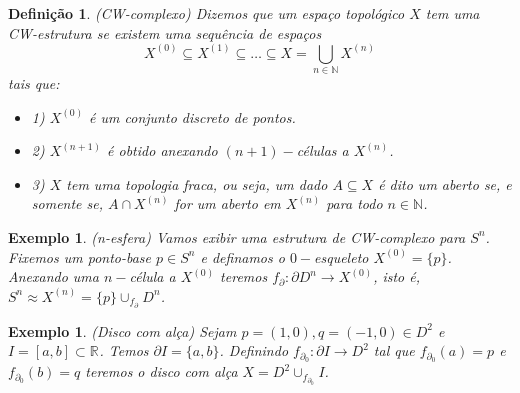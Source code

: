 \documentclass{beamer}
\newtheorem{definicao}[teorema]{Definição}
\newtheorem{exemplo}[teorema]{Exemplo}
\newcommand{\celula}[2]{D^{#1}_{#2}}
\newcommand{\real}[1]{\mathbb{R}^{#1}}
\newcommand{\reta}{\real{}}
\newcommand{\skeleton}[1]{X^{(#1)}}
\begin{document}
\begin{frame}
	
	\begin{definicao}
		(CW-complexo) Dizemos que um espaço topológico $X$ tem uma CW-estrutura se existem uma sequência de espaços
		$$
		\skeleton{0} \subseteq \skeleton{1} \subseteq \dots \subseteq X = \bigcup \limits_{n\in \mathbb{N}} \skeleton{n}
		$$ 
		tais que:
		\begin{itemize}
			\item 1) $\skeleton{0}$ é um conjunto discreto de pontos.
			
			\item 2) $\skeleton{n+1}$ é obtido anexando $(n+1)-$células a $\skeleton{n}$.
			
			\item 3) $X$ tem uma topologia fraca, ou seja, um dado $A \subseteq X$ é dito um aberto se, e somente se, $A \cap \skeleton{n}$ for um aberto em $\skeleton{n}$ para todo $n \in \mathbb{N}$.
		\end{itemize}
	\end{definicao}
\end{frame}


\begin{frame}
	\begin{exemplo}
		(n-esfera) Vamos exibir uma estrutura de CW-complexo para $S^{n}$. Fixemos um ponto-base $p \in S^{n}$ e definamos o $0-$esqueleto $\skeleton{0}=\{p\}$. Anexando uma $n-$célula a $\skeleton{0}$ teremos $f_{\partial}: \partial D^{n} \to \skeleton{0}$, isto é, $S^{n} \approx \skeleton{n} = \{p\}\cup_{f_{\partial}} \celula{n}{}$.
	\end{exemplo}
	\begin{exemplo}
		(Disco com alça) Sejam $p=(1,0), q=(-1,0) \in D^{2}$ e $I=[a,b] \subset \reta$. Temos $\partial I=\{a,b\}$. Definindo $f_{\partial_{0}}: \partial I \to D^{2}$ tal que $f_{\partial_{0}}(a)=p$ e $f_{\partial_{0}}(b)=q$ teremos o disco com alça $X=D^{2}\cup_{f_{\partial_{0}}}I$.   
	\end{exemplo}
\end{frame}
\end{document}
